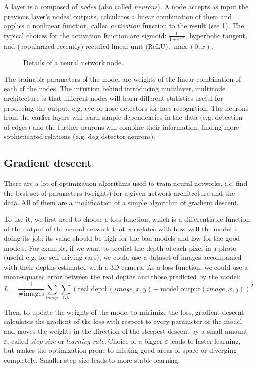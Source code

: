 A layer is a composed of \emph{nodes} (also called \emph{neurons}). A node accepts as input the previous layer's nodes' outputs, calculates a linear combination of them and applies a nonlinear function, called \emph{activation} function to the result (see \ref{ann-nodes}). The typical choices for the activation function are sigmoid: $\frac{1}{1 + e^{-x}}$, hyperbolic tangent, and (popularized recently) rectified linear unit (ReLU): $\max(0, x)$. 
\begin{figure}[h]
  \centering
  \resizebox{0.7\textwidth}{!}{
  
}
  \caption{Details of a neural network node.} \label{ann-nodes}
\end{figure}

The trainable parameters of the model are weights of the linear combination of each of the nodes. The intuition behind introducing multilayer, multinode architecture is that different nodes will learn different statistics useful for producing the output, e.g. eye or nose detectors for face recognition. The neurons from the earlier layers will learn simple dependencies in the data (e.g. detection of edges) and the further neurons will combine their information, finding more sophisticated relations (e.g. dog detector neurons).

\subsection{Gradient descent}\label{gradient descent}
There are a lot of optimization algorithms used to train neural networks, i.e. find the best set of parameters (weights) for a given network architecture and the data. All of them are a modification of a simple algorithm of gradient descent.

To use it, we first need to choose a loss function, which is a differentiable function of the output of the neural network that correlates with how well the model is doing its job; its value should be high for the bad models and low for the good  models. For example, if we want to predict the depth of each pixel in a photo (useful e.g. for self-driving cars), we could use a dataset of images accompanied with their depths estimated with a 3D camera. As a loss function, we could use a mean-squared error between the real depths and those predicted by the model:
$$
L = \frac{1}{\mbox{\# images}}\sum_{image} \sum_{x, y} (\mbox{real\_depth}(image, x, y) - \mbox{model\_output}(image, x, y))^2
$$

Then, to update the weights of the model to minimize the loss, gradient descent calculates the gradient of the loss with respect to every parameter of the model and moves the weights in the direction of the steepest descent by a small amount $\varepsilon$, called \emph{step size} or \emph{learning rate}. Choice of a bigger $\varepsilon$ leads to faster learning, but makes the optimization prone to missing good areas of space or diverging completely. Smaller step size leads to more stable
learning.


